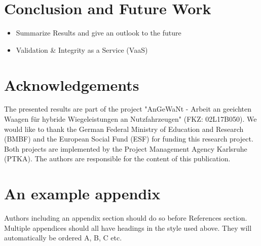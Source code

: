 \documentclass[3p,times,procedia]{elsarticle}
\begin{document}

\section{Conclusion and Future Work}
\begin{itemize}
    \item Summarize Results and give an outlook to the future 
    \item Validation \& Integrity as a Service (VaaS)
\end{itemize}

\section*{Acknowledgements}

The presented results are part of the project "AnGeWaNt - Arbeit an geeichten Waagen für hybride Wiegeleistungen an Nutzfahrzeugen" (FKZ: 02L17B050). We would like to thank the German Federal Ministry of Education and Research (BMBF) and the European Social Fund (ESF) for funding this research project. Both projects are implemented by the Project Management Agency Karlsruhe (PTKA). The authors are responsible for the content of this publication.



\appendix
\section{An example appendix}
Authors including an appendix section should do so before References section. Multiple appendices should all have headings in the style used above. They will automatically be ordered A, B, C etc.





 
\end{document}
